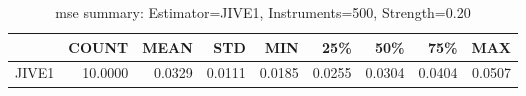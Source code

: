 \begin{table}[ht]
\centering
\caption{mse summary: Estimator=JIVE1, Instruments=500, Strength=0.20}
\begin{tabular}{lrrrrrrrr}
\toprule
 & COUNT & MEAN & STD & MIN & 25\% & 50\% & 75\% & MAX \\
\midrule
JIVE1 & 10.0000 & 0.0329 & 0.0111 & 0.0185 & 0.0255 & 0.0304 & 0.0404 & 0.0507 \\
\bottomrule
\end{tabular}
\end{table}
